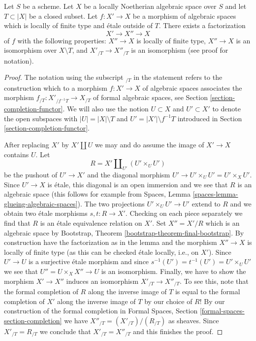 \begin{lemma}
\label{lemma-smash-away-from-T}
Let $S$ be a scheme. Let $X$ be a locally Noetherian algebraic space over $S$
and let $T \subset |X|$ be a closed subset. Let $f : X' \to X$ be a morphism
of algebraic spaces which is locally of finite type and \'etale outside of $T$.
There exists a factorization
$$
X' \longrightarrow X'' \longrightarrow X
$$
of $f$ with the following properties:
$X'' \to X$ is locally of finite type,
$X'' \to X$ is an isomorphism over $X \setminus T$, and
$X'_{/T} \to X''_{/T}$ is an isomorphism (see proof for notation).
\end{lemma}

\begin{proof}
The notation using the subscript ${}_{/T}$ in the statement refers to the
construction which to a morphism $f : X' \to X$ of algebraic spaces
associates the morphism $f_{/T} : X'_{/f^{-1}T} \to X_{/T}$ of formal
algebraic spaces, see Section \ref{section-completion-functor}.
We will also use the notion $U \subset X$ and $U' \subset X'$ to denote
the open subspaces with $|U| = |X| \setminus T$ and
$U' = |X'| \setminus f^{-1}T$ introduced in
Section \ref{section-completion-functor}.

\medskip\noindent
After replacing $X'$ by $X' \amalg U$ we may and do assume
the image of $X' \to X$ contains $U$.
Let
$$
R = X' \amalg_{U'} (U' \times_U U')
$$
be the pushout of $U' \to X'$ and the diagonal morphism
$U' \to U' \times_U U' = U' \times_X U'$. Since $U' \to X$ is \'etale,
this diagonal is an open immersion and we see that $R$ is an algebraic space
(this follows for example from
Spaces, Lemma \ref{spaces-lemma-glueing-algebraic-spaces}).
The two projections $U' \times_U U' \to U'$ extend to $R$
and we obtain two \'etale morphisms $s, t : R \to X'$.
Checking on each piece separately we find that $R$
is an \'etale equivalence relation on $X'$. Set $X'' = X'/R$
which is an algebraic space by
Bootstrap, Theorem \ref{bootstrap-theorem-final-bootstrap}.
By construction have the factorization as in the lemma and
the morphism $X'' \to X$ is locally of finite type (as this
can be checked \'etale locally, i.e., on $X'$).
Since $U' \to U$ is a surjective \'etale morphism
and since $s^{-1}(U') = t^{-1}(U') = U' \times_U U'$
we see that $U'' = U \times_X X'' \to U$ is an isomorphism.
Finally, we have to show the morphism $X' \to X''$ induces an isomorphism
$X'_{/T} \to X''_{/T}$. To see this, note that the formal completion of $R$
along the inverse image of $T$ is equal to the formal completion of
$X'$ along the inverse image of $T$ by our choice of $R$! By
our construction of the formal completion in
Formal Spaces, Section \ref{formal-spaces-section-completion}
we have $X''_{/T} = (X'_{/T}) / (R_{/T})$ as sheaves. Since
$X'_{/T} = R_{/T}$ we conclude that $X'_{/T} = X''_{/T}$
and this finishes the proof.
\end{proof}








